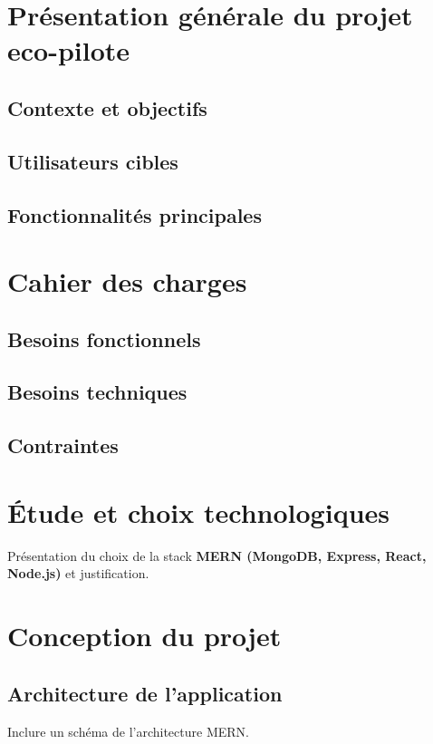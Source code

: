 \documentclass[12pt,a4paper]{report}
\begin{document}
\chapter{Présentation générale du projet eco-pilote}
\section{Contexte et objectifs}
\section{Utilisateurs cibles}
\section{Fonctionnalités principales}

\chapter{Cahier des charges}
\section{Besoins fonctionnels}
\section{Besoins techniques}
\section{Contraintes}

\chapter{Étude et choix technologiques}
Présentation du choix de la stack \textbf{MERN (MongoDB, Express, React, Node.js)} et justification.  

\chapter{Conception du projet}
\section{Architecture de l’application}
Inclure un schéma de l’architecture MERN.  
\end{document}

